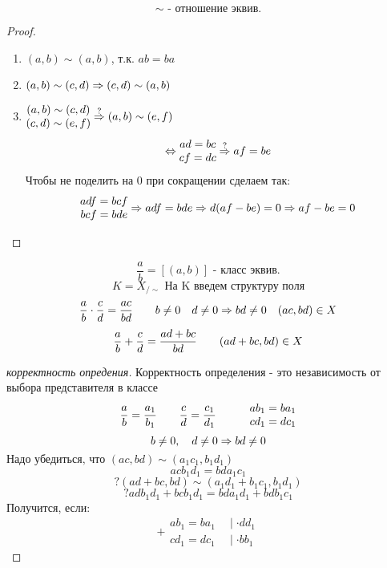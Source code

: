\documentclass[algebra]{subfiles}
\begin{document}
    \begin{Utv}
        \[\sim \text{ - отношение эквив.}\]
    \end{Utv}

    \begin{proof}
        \begin{enumerate}
          \item $(a, b) \sim (a, b)$, т.к. $ab = ba$
          \item $(a, b) \sim (c, d) \Rightarrow (c, d) \sim (a, b)$
          \item $\begin{matrix}
              (a, b) \sim (c, d)\\
              (c, d) \sim (e, f)
          \end{matrix}
          \overset{?}{\Rightarrow} (a, b) \sim (e, f)$
          \[\Leftrightarrow \begin{matrix}
            ad = bc\\
            cf = dc
          \end{matrix}
          \overset{?}{\Rightarrow} af = be\]
          Чтобы не поделить на 0 при сокращении сделаем так:
          \[\begin{matrix}
            adf = bcf \\
            bcf = bde
          \end{matrix}
          \Rightarrow adf = bde \Rightarrow d(af - be) = 0 \Rightarrow af - be = 0\]
        \end{enumerate}
    \end{proof}

    \begin{Definition}
        \[\frac{a}{b} = [(a, b)] \text{ - класс эквив.} \]
        \[K = X_{/\sim} \text{ На K введем структуру поля}\]
        \[\frac{a}{b} \cdot \frac{c}{d} = \frac{ac}{bd} \quad \quad b \neq 0 \quad d \neq 0 \Rightarrow bd \neq 0 \quad (ac, bd) \in X\]
        \[\frac{a}{b} + \frac{c}{d} = \frac{ad + bc}{bd} \quad\quad (ad + bc, bd) \in X\]
    \end{Definition}

    \begin{proof}[корректность опредения]
       Корректность определения - это независимость от выбора представителя в классе
        \[\frac{a}{b} = \frac{a_1}{b_1} \quad\quad \frac{c}{d} = \frac{c_1}{d_1} \quad\quad\quad
        \begin{matrix}
            ab_1 = ba_1\\
            cd_1 = dc_1
        \end{matrix}\]
        \[b \neq 0, \quad d \neq 0 \Rightarrow bd \neq 0\]
        $\text{Надо убедиться, что }(ac, bd) \sim (a_1 c_1, b_1 d_1)$
        \[a c b_1 d_1 = bd a_1 c_1\]
        \[? (ad + bc, bd) \sim (a_1 d_1 + b_1 c_1, b_1 d_1)\]
        \[? ad b_1 d_1 + bc b_1 d_1 = bd a_1 d_1 + bd b_1 c_1\]
        Получится, если:
        \[+ \begin{matrix}
            ab_1 = ba_1 & \ \mid \cdot dd_1\\
            cd_1 = dc_1 & \ \mid \cdot bb_1
        \end{matrix}\]
    \end{proof}
\end{document}
